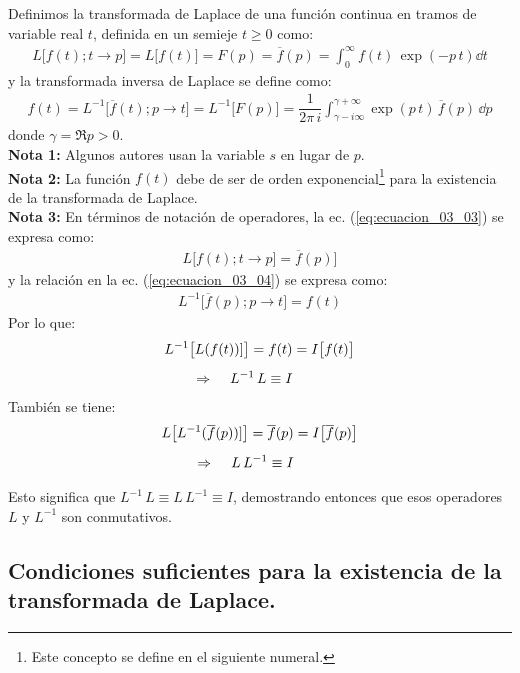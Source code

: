 Definimos la transformada de Laplace de una función continua en tramos de variable real $t$, definida en un semieje $t \geq 0$ como:
\begin{align}
L \big[f(t); t \to p\big] = L \big[f(t)\big] = F(p) = \overline{f}(p) = \int_{0}^{\infty} f(t) \, \exp(-p \, t) \dd{t}
\label{eq:ecuacion_03_03}
\end{align}
y la transformada inversa de Laplace se define como:
\begin{align}
f(t) = L^{-1} \big[\overline{f}(t); p \to t\big] = L^{-1} \big[F(p)\big] = \dfrac{1}{2 \pi \, i} \int_{\gamma-i \infty}^{\gamma+\infty} \exp(p \, t) \, \overline{f} (p) \, \dd{p}
\label{eq:ecuacion_03_04}
\end{align}
donde $\gamma = \Re{p} > 0$.
\\[1em]
\noindent \textbf{Nota 1: } Algunos autores usan la variable $s$ en lugar de $p$.
\\
\textbf{Nota 2: } La función $f(t)$ debe de ser de orden exponencial\footnote{Este concepto se define en el siguiente numeral.} para la existencia de la transformada de Laplace.
\\
\textbf{Nota 3: } En términos de notación de operadores, la ec. (\ref{eq:ecuacion_03_03}) se expresa como:
\begin{align}
L \big[ f(t); t \to p] = \overline{f} (p) \big]
\label{eq:ecuacion_03_05}
\end{align}
y la relación en la ec. (\ref{eq:ecuacion_03_04}) se expresa como:
\begin{align}
L^{-1} \big[\overline{f}(p); p \to t \big] = f (t)
\label{eq:ecuacion_03_06}
\end{align}
Por lo que:
\begin{align*}
L^{-1} \big[L(f(t))]\big] = f(t) &= I \big[f(t)\big] \\[0.5em]
\Rightarrow \hspace{0.4cm} L^{-1} \, L \equiv I
\end{align*}
También se tiene:
\begin{align*}
L \big[L^{-1} (\overline{f}(p))]\big] = \overline{f}(p) &= I \big[\overline{f}(p)\big] \\[0.5em]
\Rightarrow \hspace{0.4cm} L \, L^{-1} \equiv I
\end{align*}

Esto significa que $L^{-1} \, L \equiv L \, L^{-1} \equiv I$, demostrando entonces que esos operadores $L$ y $L^{-1}$ son conmutativos.

\subsection{Condiciones suficientes para la existencia de la transformada de Laplace.}

